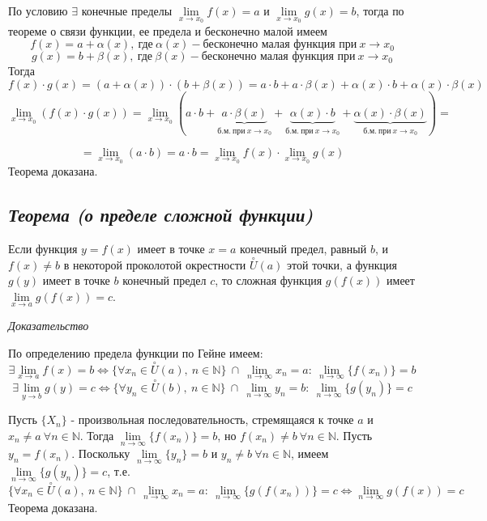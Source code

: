 По условию $\exists$ конечные пределы $\lim\limits_{x \to x_0}f(x)=a$ и $\lim\limits_{x \to x_0}g(x) = b$, тогда по теореме о связи функции, ее предела и бесконечно малой имеем $$f(x) = a + \alpha(x), \ \text{где} \ \alpha(x) - \text{бесконечно малая функция при} \ x \rightarrow x_0 $$ $$g(x) = b + \beta(x), \ \text{где} \ \beta(x) - \text{бесконечно малая функция при} \ x \rightarrow x_0 $$ Тогда $$f(x)\cdot g(x) = (a + \alpha(x))\cdot(b + \beta(x)) = a\cdot b + a\cdot \beta(x) + \alpha(x)\cdot b + \alpha(x)\cdot \beta(x)$$ $$\lim\limits_{x \to x_0}(f(x)\cdot g(x)) = \lim\limits_{x \to x_0}(a\cdot b + \underbrace{a\cdot \beta(x)}_{б.м.\ при \ x \rightarrow x_0} + \underbrace{\alpha(x)\cdot b}_{б.м.\ при \ x \rightarrow x_0} + \underbrace{\alpha(x)\cdot \beta(x)}_{б.м.\ при \ x \rightarrow x_0}) =$$

$$= \lim\limits_{x \to x_0}(a\cdot b) = a\cdot b = \lim\limits_{x \to x_0}f(x) \cdot \lim\limits_{x \to x_0}g(x)$$ Теорема доказана.
\newpage 
\subsection{\textit{Теорема (о пределе сложной функции)}}

Если функция $y = f(x)$ имеет в точке $x = a$ конечный предел, равный $b$, и $f(x) \neq b$ в некоторой проколотой окрестности $\overset{\circ}U(a)$ этой точки, а функция $g(y)$ имеет в точке $b$ конечный предел $c$, то сложная функция $g(f(x))$ имеет $\lim\limits_{x \to a}g(f(x)) = c$.

\textit{Доказательство}

По определению предела функции по Гейне имеем: $$\exists \lim\limits_{x \to a}f(x) = b \iff \{\forall x_n \in \overset{\circ}U(a), \ n \in \mathbb{N}\} \ \cap \ \lim\limits_{n \to \infty}{x_n} = a : \ \lim\limits_{n \to \infty}\{f(x_n)\} = b$$ $$\exists \lim\limits_{y \to b}g(y) = c \iff \{\forall y_n \in \overset{\circ}U(b), \ n \in \mathbb{N}\} \ \cap \ \lim\limits_{n \to \infty}{y_n} = b : \ \lim\limits_{n \to \infty}\{g(y_n)\} = c$$

Пусть $\{X_n\}$ - произвольная последовательность, стремящаяся к точке $a$ и $x_n \neq a \ \forall n \in \mathbb{N}$. Тогда $\lim\limits_{n \to \infty}{\{f(x_n)\}} = b$, но $f(x_n) \neq b \ \forall n \in \mathbb{N}$. Пусть $y_n = f(x_n)$. Поскольку $\lim\limits_{n \to \infty}{\{y_n\}} = b$ и $y_n \neq b \ \forall n \in \mathbb{N}$, имеем $\lim\limits_{n \to \infty}{\{g(y_n)\}} = c$, т.е. $$\{\forall x_n \in \overset{\circ}U(a), \ n \in \mathbb{N}\} \ \cap \ \lim\limits_{n \to \infty}{x_n} = a : \ \lim\limits_{n \to \infty}\{g(f(x_n))\} = c \iff \lim\limits_{n \to \infty} g(f(x)) = c$$ Теорема доказана.
\newpage 
